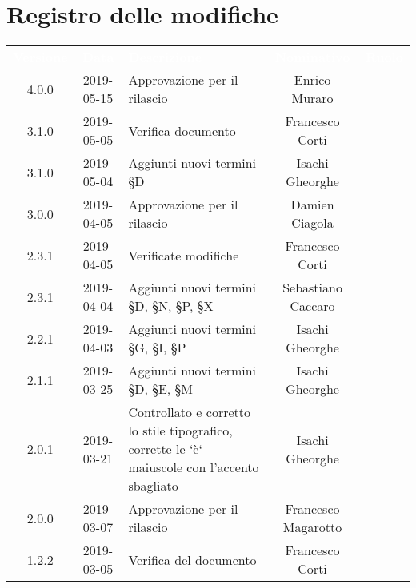 
\section*{Registro delle modifiche}
{
	\renewcommand{\arraystretch}{1.5}
	\centering
	\begin{longtable}{ c c  C{4cm}  c  c }
		
		\textcolor{white}{\textbf{Versione}} & \textcolor{white}{\textbf{Data}} & \textcolor{white}{\textbf{Descrizione}} & \textcolor{white}{\textbf{Nominativo}} & \textcolor{white}{\textbf{Ruolo}}\\
		
		4.0.0 & 2019-05-15 & Approvazione per il rilascio & Enrico Muraro & \Res{}\\
		
		3.1.0 & 2019-05-05 & Verifica documento & Francesco Corti &\ver{}\\
		
		3.1.0 & 2019-05-04 & Aggiunti nuovi termini \S{D} & Isachi Gheorghe &\reda{}\\		
		
		3.0.0 & 2019-04-05 & Approvazione per il rilascio & Damien Ciagola &\Res{}\\

		2.3.1 & 2019-04-05 & Verificate modifiche & Francesco Corti &\ver{}\\

		2.3.1 & 2019-04-04 & Aggiunti nuovi termini \S{D}, \S{N}, \S{P}, \S{X} & Sebastiano Caccaro &\reda{}\\

		2.2.1 & 2019-04-03 & Aggiunti nuovi termini \S{G}, \S{I}, \S{P} & Isachi Gheorghe &\reda{}\\

		2.1.1 & 2019-03-25 & Aggiunti nuovi termini \S{D}, \S{E}, \S{M} & Isachi Gheorghe &\reda{}\\

		2.0.1 & 2019-03-21 & Controllato e corretto lo stile tipografico, corrette le `è` maiuscole con l'accento sbagliato &  Isachi Gheorghe & \reda{}\\			
		
		2.0.0 & 2019-03-07 & Approvazione per il rilascio &  Francesco Magarotto & \Res{}\\	

		1.2.2 & 2019-03-05 & Verifica del documento &  Francesco Corti & \ver{}\\		
		

\end{longtable}}
